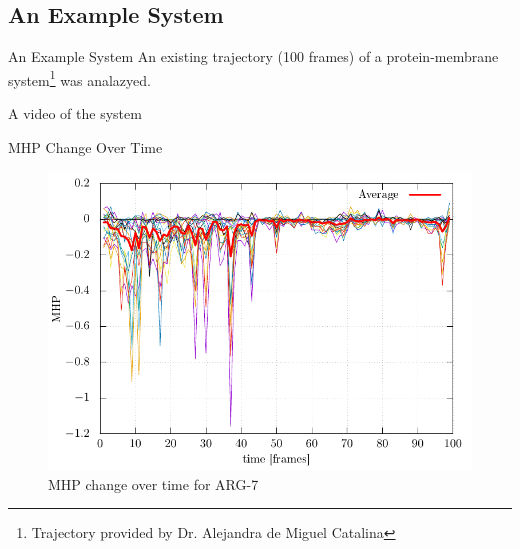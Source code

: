 \documentclass{beamer}
\begin{document}
\subsection{An Example System}
\begin{frame}{An Example System}
	An existing trajectory (100 frames) of a protein-membrane system\footnote{Trajectory provided by Dr. Alejandra de Miguel Catalina} was analazyed.\\
	\begin{itemize}
        \setlength\itemsep{1.5em}
	\end{itemize}
\end{frame}
\begin{frame}{A video of the system}
\end{frame}
\begin{frame}{MHP Change Over Time}
	\centering
	\begin{figure}[h!]
		\caption{MHP change over time for ARG-7}
		\includegraphics[scale=0.75]{ARG07_graph.pdf}
	\end{figure}
\end{frame}
\end{document}
